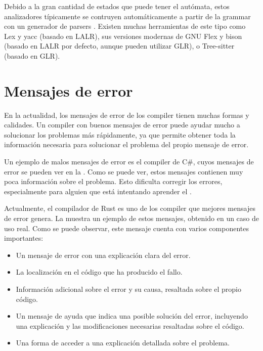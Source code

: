 Debido a la gran cantidad de estados que puede tener el autómata, estos
analizadores típicamente se contruyen automáticamente a partir de la
\gls{grammar} con un generador de \glspl{parser} \parencite{dragon-book}.
Existen muchas herramientas de este tipo como Lex y yacc \parencite{yacc}
(basado en LALR), sus versiones modernas de GNU Flex y bison \parencite{bison}
(basado en LALR por defecto, aunque pueden utilizar GLR), o Tree-sitter
\parencite{tree-sitter} (basado en GLR).

\section{Mensajes de error}\label{sec:error-messages}

En la actualidad, los mensajes de error de los \gls{compiler} tienen muchas
formas y calidades. Un \gls{compiler} con buenos mensajes de error puede ayudar
mucho a solucionar los problemas más rápidamente, ya que permite obtener toda la
información necesaria para solucionar el problema del propio mensaje de error.

Un ejemplo de malos mensajes de error es el \gls{compiler} de C\#, cuyos mensajes
de error se pueden ver en la . Como se puede ver, estos
mensajes contienen muy poca información sobre el problema. Esto dificulta
corregir los errores, especialmente para alguien que está intentando aprender el
.


Actualmente, el compilador de Rust \parencite{Rust} es uno de los
compiler que mejores mensajes de error genera. La 
muestra un ejemplo de estos mensajes, obtenido en un caso de uso real. Como se
puede observar, este mensaje cuenta con varios componentes importantes:

\begin{itemize}
    \item Un mensaje de error con una explicación clara del error.
    \item La localización en el código que ha producido el fallo.
    \item Información adicional sobre el error y su causa, resaltada sobre el
    propio código.
    \item Un mensaje de ayuda que indica una posible solución del error,
    incluyendo una explicación y las modificaciones necesarias resaltadas sobre
    el código.
    \item Una forma de acceder a una explicación detallada sobre el problema.
\end{itemize}


